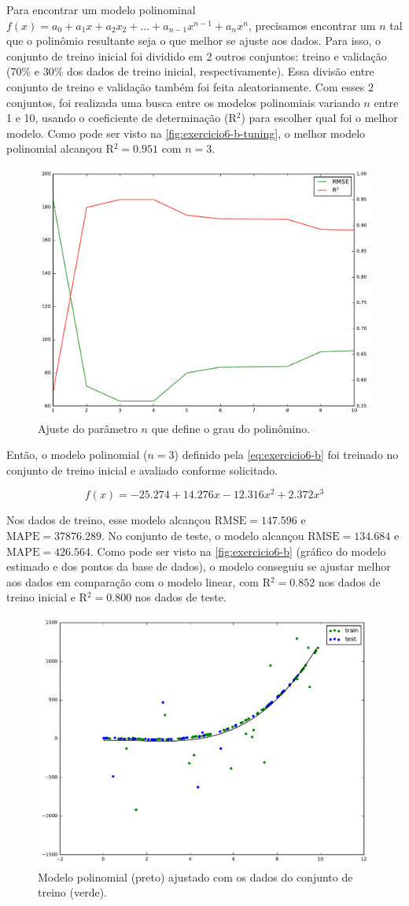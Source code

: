 \documentclass{article}
\begin{document}
Para encontrar um modelo polinominal $f(x) = a_0 + a_1x + a_2x_2 + \dots + a_{n-1}x^{n-1} + a_nx^n$, precisamos encontrar um $n$ tal que o polinômio resultante seja o que melhor se ajuste aos dados. Para isso, o conjunto de treino inicial foi dividido em 2 outros conjuntos: treino e validação (70\% e 30\% dos dados de treino inicial, respectivamente). Essa divisão entre conjunto de treino e validação também foi feita aleatoriamente. Com esses 2 conjuntos, foi realizada uma busca entre os modelos polinomiais variando $n$ entre 1 e 10, usando o coeficiente de determinação (R$^2$) para escolher qual foi o melhor modelo. Como pode ser visto na \autoref{fig:exercicio6-b-tuning}, o melhor modelo polinomial alcançou R$^2 = 0.951$ com $n=3$.

\begin{figure}[h]
	\centering
	\includegraphics[width=0.5\linewidth]{exercicio6-b-tuning.pdf}
	\caption{Ajuste do parâmetro $n$ que define o grau do polinômino.}
	\label{fig:exercicio6-b-tuning}
\end{figure}

Então, o modelo polinomial ($n=3$) definido pela \autoref{eq:exercicio6-b} foi treinado no conjunto de treino inicial e avaliado conforme solicitado.

\begin{equation}
\label{eq:exercicio6-b}
f(x) = -25.274 + 14.276x - 12.316x^2 + 2.372x^3
\end{equation}

Nos dados de treino, esse modelo alcançou $\mathrm{RMSE} = 147.596$ e $\mathrm{MAPE} = 37876.289$. No conjunto de teste, o modelo alcançou $\mathrm{RMSE} = 134.684$ e $\mathrm{MAPE} = 426.564$. Como pode ser visto na \autoref{fig:exercicio6-b} (gráfico do modelo estimado e dos pontos da base de dados), o modelo conseguiu se ajustar melhor aos dados em comparação com o modelo linear, com R$^2 = 0.852$ nos dados de treino inicial e R$^2 = 0.800$ nos dados de teste.

\begin{figure}[h]
	\centering
	\includegraphics[width=0.5\linewidth]{exercicio6-b.pdf}
	\caption{Modelo polinomial (preto) ajustado com os dados do conjunto de treino (verde).}
	\label{fig:exercicio6-b}
\end{figure}
\end{document}
